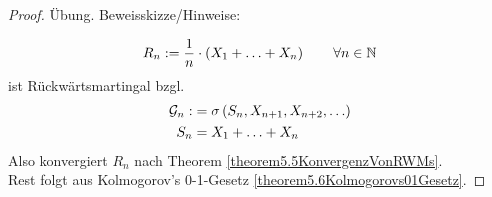 \begin{proof}
	Übung. Beweisskizze/Hinweise:

	\begin{align*}
		R_n:=\frac{1}{n}\cdot\left(X_1+\ldots+X_n\right)\qquad\forall n\in\mathbb{N}
	\end{align*}
	ist Rückwärtsmartingal bzgl.
	\begin{align*}
		\mathcal{G}_n:&=\sigma\left(S_n,X_{n+1},X_{n+2},\ldots\right)\\
		S_n&=X_1+\ldots+X_n
	\end{align*}
	Also konvergiert $R_n$ nach Theorem \ref{theorem5.5KonvergenzVonRWMs}.\\
	Rest folgt aus Kolmogorov's 0-1-Gesetz \ref{theorem5.6Kolmogorovs01Gesetz}.
\end{proof}
